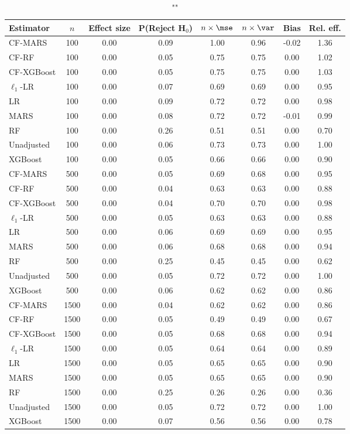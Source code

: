 \begin{table}
\centering
\caption{""}
\begin{tabular}{lccccccc}
\toprule
Estimator & $n$ & Effect size & P(Reject H$_0$) & $n\times\mse$ & $n\times \var$ & Bias & Rel. eff.\\ \midrule
CF-MARS & 100 & 0.00 & 0.09 & 1.00 & 0.96 & -0.02 & 1.36 \\ 
CF-RF & 100 & 0.00 & 0.05 & 0.75 & 0.75 &  0.00 & 1.02 \\ 
CF-XGBoost & 100 & 0.00 & 0.05 & 0.75 & 0.75 &  0.00 & 1.03 \\ 
$\ell_1$-LR & 100 & 0.00 & 0.07 & 0.69 & 0.69 &  0.00 & 0.95 \\ 
LR & 100 & 0.00 & 0.09 & 0.72 & 0.72 &  0.00 & 0.98 \\ 
MARS & 100 & 0.00 & 0.08 & 0.72 & 0.72 & -0.01 & 0.99 \\ 
RF & 100 & 0.00 & 0.26 & 0.51 & 0.51 &  0.00 & 0.70 \\ 
Unadjusted & 100 & 0.00 & 0.06 & 0.73 & 0.73 &  0.00 & 1.00 \\ 
XGBoost & 100 & 0.00 & 0.05 & 0.66 & 0.66 &  0.00 & 0.90 \\ \addlinespace 
CF-MARS & 500 & 0.00 & 0.05 & 0.69 & 0.68 &  0.00 & 0.95 \\ 
CF-RF & 500 & 0.00 & 0.04 & 0.63 & 0.63 &  0.00 & 0.88 \\ 
CF-XGBoost & 500 & 0.00 & 0.04 & 0.70 & 0.70 &  0.00 & 0.98 \\ 
$\ell_1$-LR & 500 & 0.00 & 0.05 & 0.63 & 0.63 &  0.00 & 0.88 \\ 
LR & 500 & 0.00 & 0.06 & 0.69 & 0.69 &  0.00 & 0.95 \\ 
MARS & 500 & 0.00 & 0.06 & 0.68 & 0.68 &  0.00 & 0.94 \\ 
RF & 500 & 0.00 & 0.25 & 0.45 & 0.45 &  0.00 & 0.62 \\ 
Unadjusted & 500 & 0.00 & 0.05 & 0.72 & 0.72 &  0.00 & 1.00 \\ 
XGBoost & 500 & 0.00 & 0.06 & 0.62 & 0.62 &  0.00 & 0.86 \\ \addlinespace 
CF-MARS & 1500 & 0.00 & 0.04 & 0.62 & 0.62 &  0.00 & 0.86 \\ 
CF-RF & 1500 & 0.00 & 0.05 & 0.49 & 0.49 &  0.00 & 0.67 \\ 
CF-XGBoost & 1500 & 0.00 & 0.05 & 0.68 & 0.68 &  0.00 & 0.94 \\ 
$\ell_1$-LR & 1500 & 0.00 & 0.05 & 0.64 & 0.64 &  0.00 & 0.89 \\ 
LR & 1500 & 0.00 & 0.05 & 0.65 & 0.65 &  0.00 & 0.90 \\ 
MARS & 1500 & 0.00 & 0.05 & 0.65 & 0.65 &  0.00 & 0.90 \\ 
RF & 1500 & 0.00 & 0.25 & 0.26 & 0.26 &  0.00 & 0.36 \\ 
Unadjusted & 1500 & 0.00 & 0.05 & 0.72 & 0.72 &  0.00 & 1.00 \\ 
XGBoost & 1500 & 0.00 & 0.07 & 0.56 & 0.56 &  0.00 & 0.78 \\
\bottomrule
\end{tabular}
\end{table}

